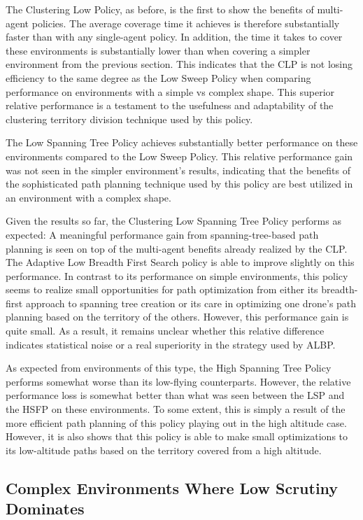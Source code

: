 The Clustering Low Policy, as before, is the first to show the benefits of multi-agent policies. The average coverage time it achieves is therefore substantially faster than with any single-agent policy. In addition, the time it takes to cover these environments is substantially lower than when covering a simpler environment from the previous section. This indicates that the CLP is not losing efficiency to the same degree as the Low Sweep Policy when comparing performance on environments with a simple vs complex shape. This superior relative performance is a testament to the usefulness and adaptability of the clustering territory division technique used by this policy.

The Low Spanning Tree Policy achieves substantially better performance on these environments compared to the Low Sweep Policy. This relative performance gain was not seen in the simpler environment's results, indicating that the benefits of the sophisticated path planning technique used by this policy are best utilized in an environment with a complex shape.

Given the results so far, the Clustering Low Spanning Tree Policy performs as expected: A meaningful performance gain from spanning-tree-based path planning is seen on top of the multi-agent benefits already realized by the CLP. The Adaptive Low Breadth First Search policy is able to improve slightly on this performance. In contrast to its performance on simple environments, this policy seems to realize small opportunities for path optimization from either its breadth-first approach to spanning tree creation or its care in optimizing one drone's path planning based on the territory of the others. However, this performance gain is quite small. As a result, it remains unclear whether this relative difference indicates statistical noise or a real superiority in the strategy used by ALBP.

As expected from environments of this type, the High Spanning Tree Policy performs somewhat worse than its low-flying counterparts. However, the relative performance loss is somewhat better than what was seen between the LSP and the HSFP on these environments. To some extent, this is simply a result of the more efficient path planning of this policy playing out in the high altitude case. However, it is also shows that this policy is able to make small optimizations to its low-altitude paths based on the territory covered from a high altitude.

\subsection{Complex Environments Where Low Scrutiny Dominates}

